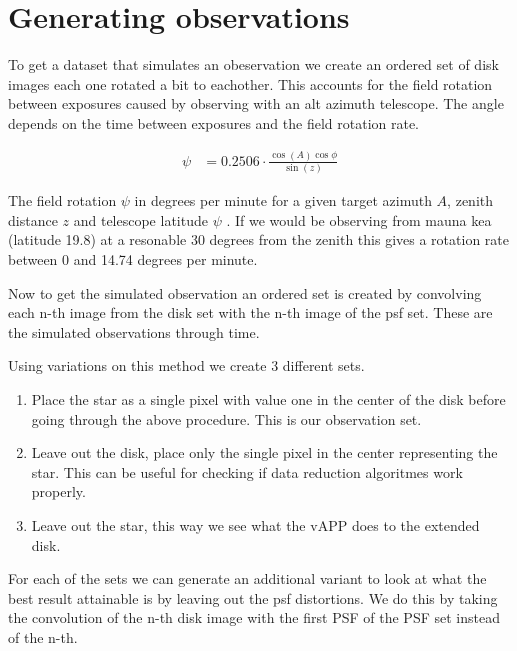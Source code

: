 




\section{Generating observations}
\label{sec:gen}
To get a dataset that simulates an obeservation we create an ordered set of disk images each one rotated a bit to eachother. This accounts for the field rotation between exposures caused by observing with an alt azimuth telescope. The angle depends on the time between exposures and the field rotation rate.

\begin{align}
  \psi &= 0.2506 \cdot \frac{\cos(A) \cos \phi}{\sin(z)} 
\end{align}

The field rotation $\psi$ in degrees per minute for a given target azimuth $A$, zenith distance $z$ and telescope latitude $\psi$ \cite[page 95]{Electronic_imaging}. If we would be observing from mauna kea (latitude 19.8) at a resonable 30 degrees from the zenith this gives a rotation rate between 0 and  14.74 degrees per minute.

Now to get the simulated observation an ordered set is created by convolving each n-th image from the disk set with the n-th image of the psf set. These are the simulated observations through time. 

Using variations on this method we create 3 different sets.

\begin{enumerate}
\item Place the star as a single pixel with value one in the center of the disk before going through the above procedure. This is our observation set.
\item Leave out the disk, place only the single pixel in the center representing the star. This can be useful for checking if data reduction algoritmes work properly.
\item Leave out the star, this way we see what the \ac{vAPP} does to the extended disk.
\end{enumerate}

For each of the sets we can generate an additional variant to look at what the best result attainable is by leaving out the psf distortions. We do this by taking the convolution of the n-th disk image with the first \ac{PSF} of the \ac{PSF} set instead of the n-th.
